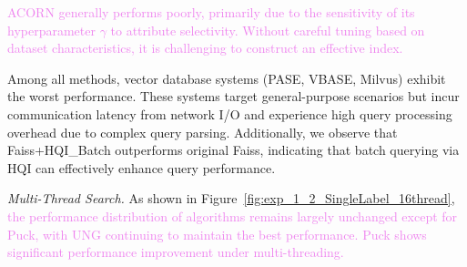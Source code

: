 \documentclass[sigconf, nonacm]{acmart}
\begin{document}
	\textcolor{violet}{ACORN generally performs poorly, primarily due to the sensitivity of its hyperparameter $\gamma$ to attribute selectivity. Without careful tuning based on dataset characteristics, it is challenging to construct an effective index.}
	
	Among all methods, vector database systems (PASE, VBASE, Milvus) exhibit the worst performance. These systems target general-purpose scenarios but incur communication latency from network I/O and experience high query processing overhead due to complex query parsing. Additionally, we observe that Faiss+HQI\_Batch outperforms original Faiss, indicating that batch querying via HQI can effectively enhance query performance.
	
	\textit{Multi-Thread Search.}
	As shown in Figure~\ref{fig:exp_1_2_SingleLabel_16thread}, \textcolor{violet}{the performance distribution of algorithms remains largely unchanged except for Puck, with UNG continuing to maintain the best performance. Puck shows significant performance improvement under multi-threading.}
	
\end{document}
